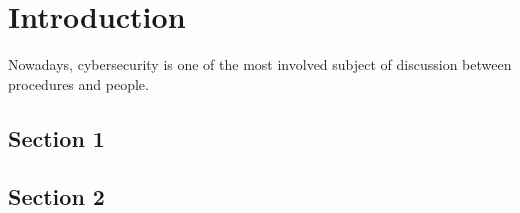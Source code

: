 \chapter{Introduction}
\label{cha:intro}

Nowadays, cybersecurity is one of the most involved subject of discussion between procedures and people. 

\section{Section 1}
\label{sec:context}


\section{Section 2}
\label{sec:problem}


